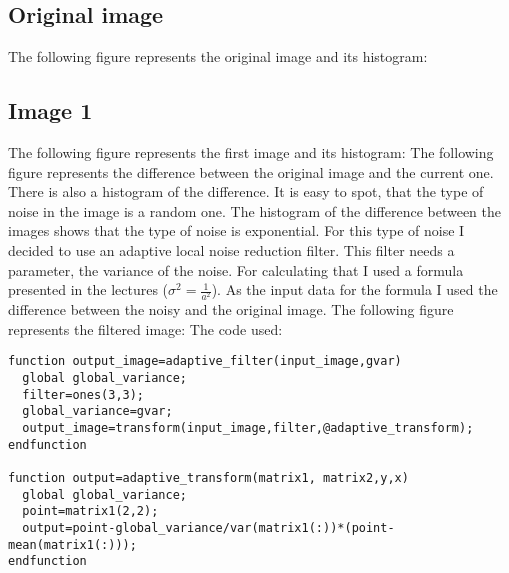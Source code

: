 \documentclass[a4paper]{article}
\begin{document}
\subsection{Original image}
The following figure represents the original image and its histogram:
\subsection{Image 1}
The following figure represents the first image and its histogram:
The following figure represents the difference between the original image
and the current one. There is also a histogram of the difference.
It is easy to spot, that the type of noise in the image
is a random one. The histogram of the difference between the images shows that the type of noise is exponential. For this type of noise I decided to use an adaptive local noise reduction filter. This filter needs a parameter, the variance of the noise. For calculating that I used a formula presented in the lectures (\(\sigma^2=\frac{1}{a^2}\)). As the input data for the formula I used the difference between the noisy and the original image. The following figure represents the filtered image:
{\noindent}The code used:
\begin{lstlisting}
function output_image=adaptive_filter(input_image,gvar)
  global global_variance;
  filter=ones(3,3);
  global_variance=gvar;
  output_image=transform(input_image,filter,@adaptive_transform);
endfunction

function output=adaptive_transform(matrix1, matrix2,y,x)
  global global_variance;
  point=matrix1(2,2);
  output=point-global_variance/var(matrix1(:))*(point-mean(matrix1(:)));
endfunction
\end{lstlisting}
\end{document}
